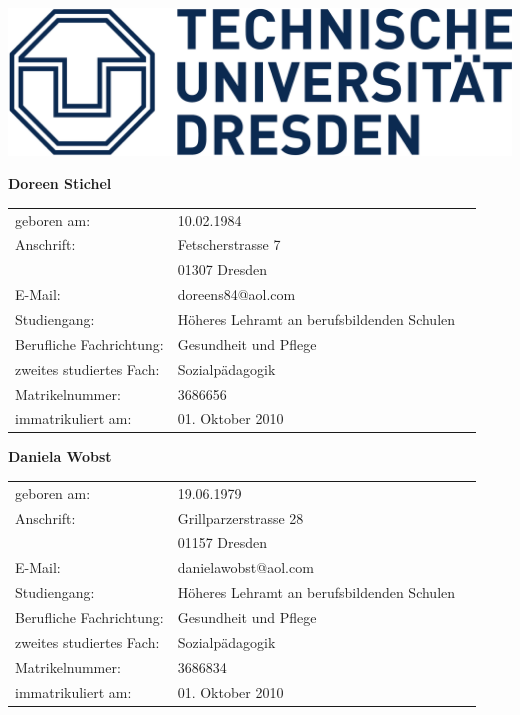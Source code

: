 \begin{flushright}
	\includegraphics[scale=0.5]{images/TU-Logo.png}
\end{flushright}

\noindent
\textbf{Doreen Stichel}\\[0,5cm]
\begin{tabular}{lll}
geboren am: & 10.02.1984\\[0,5cm]
Anschrift: & Fetscherstrasse 7\\
& 01307 Dresden\\[0,5cm]
E-Mail: & \flq{}doreens84@aol.com\frq{}\\[0,5cm]
Studiengang: & Höheres Lehramt an berufsbildenden Schulen\\
Berufliche Fachrichtung: & Gesundheit und Pflege\\
zweites studiertes Fach: & Sozialpädagogik\\[0,5cm]
Matrikelnummer: & 3686656\\[0,5cm]
immatrikuliert am: & 01. Oktober 2010\\[2cm]
\end{tabular}

\noindent
\textbf{Daniela Wobst}\\[0,5cm]
\begin{tabular}{lll}
geboren am: & 19.06.1979\\[0,5cm]
Anschrift: & Grillparzerstrasse 28\\
& 01157 Dresden\\[0,5cm]
E-Mail: & \flq{}danielawobst@aol.com\frq{}\\[0,5cm]
Studiengang: & Höheres Lehramt an berufsbildenden Schulen\\
Berufliche Fachrichtung: & Gesundheit und Pflege\\
zweites studiertes Fach: & Sozialpädagogik\\[0,5cm]
Matrikelnummer: & 3686834\\[0,5cm]
immatrikuliert am: & 01. Oktober 2010
\end{tabular}